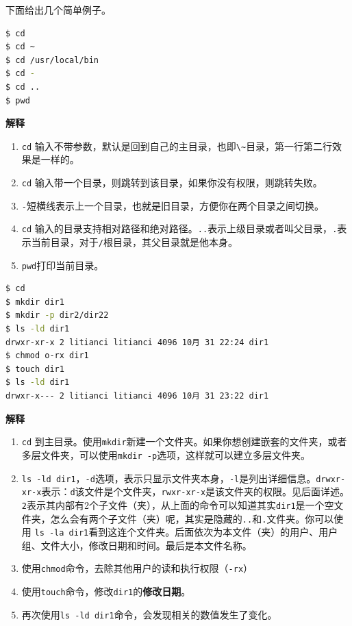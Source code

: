 \documentclass[doctor,openright,twoside]{sjtuthesis}
\providecommand{\tightlist}{%
    \setlength{\itemsep}{0pt}\setlength{\parskip}{0pt}}
\newcommand{\passthrough}[1]{#1}
\theoremstyle{plain}
\theoremstyle{definition}
\theoremstyle{remark}
\theoremstyle{ocrenumbox}
\theoremstyle{plain}
\begin{document}
下面给出几个简单例子。

\begin{lstlisting}[language=bash]
$ cd
$ cd ~
$ cd /usr/local/bin
$ cd -
$ cd ..
$ pwd
\end{lstlisting}

\textbf{解释}

\begin{enumerate}
\def\labelenumi{\arabic{enumi}.}
\tightlist
\item
  \passthrough{\lstinline!cd!} 输入不带参数，默认是回到自己的主目录，也即\passthrough{\lstinline!\~!}目录，第一行第二行效果是一样的。
\item
  \passthrough{\lstinline!cd!} 输入带一个目录，则跳转到该目录，如果你没有权限，则跳转失败。
\item
  \passthrough{\lstinline!-!}短横线表示上一个目录，也就是旧目录，方便你在两个目录之间切换。
\item
  \passthrough{\lstinline!cd!} 输入的目录支持相对路径和绝对路径。\passthrough{\lstinline!..!}表示上级目录或者叫父目录，\passthrough{\lstinline!.!}表示当前目录，对于\passthrough{\lstinline!/!}根目录，其父目录就是他本身。
\item
  \passthrough{\lstinline!pwd!}打印当前目录。
\end{enumerate}

\begin{lstlisting}[language=bash]
$ cd
$ mkdir dir1
$ mkdir -p dir2/dir22
$ ls -ld dir1
drwxr-xr-x 2 litianci litianci 4096 10月 31 22:24 dir1
$ chmod o-rx dir1
$ touch dir1
$ ls -ld dir1
drwxr-x--- 2 litianci litianci 4096 10月 31 23:22 dir1
\end{lstlisting}

\textbf{解释}

\begin{enumerate}
\def\labelenumi{\arabic{enumi}.}
\tightlist
\item
  \passthrough{\lstinline!cd!} 到主目录。使用\passthrough{\lstinline!mkdir!}新建一个文件夹。如果你想创建嵌套的文件夹，或者多层文件夹，可以使用\passthrough{\lstinline!mkdir -p!}选项，这样就可以建立多层文件夹。
\item
  \passthrough{\lstinline!ls -ld dir1!}，\passthrough{\lstinline!-d!}选项，表示只显示文件夹本身，\passthrough{\lstinline!-l!}是列出详细信息。\passthrough{\lstinline!drwxr-xr-x!}表示：\passthrough{\lstinline!d!}该文件是个文件夹，\passthrough{\lstinline!rwxr-xr-x!}是该文件夹的权限。见后面详述。\passthrough{\lstinline!2!}表示其内部有2个子文件（夹），从上面的命令可以知道其实\passthrough{\lstinline!dir1!}是一个空文件夹，怎么会有两个子文件（夹）呢，其实是隐藏的\passthrough{\lstinline!..!}和\passthrough{\lstinline!.!}文件夹。你可以使用 \passthrough{\lstinline!ls -la dir1!}看到这连个文件夹。后面依次为本文件（夹）的用户、用户组、文件大小，修改日期和时间。最后是本文件名称。
\item
  使用\passthrough{\lstinline!chmod!}命令，去除其他用户的读和执行权限（\passthrough{\lstinline!-rx!}）
\item
  使用\passthrough{\lstinline!touch!}命令，修改\passthrough{\lstinline!dir1!}的\textbf{修改日期}。
\item
  再次使用\passthrough{\lstinline!ls -ld dir1!}命令，会发现相关的数值发生了变化。
\end{enumerate}
\end{document}
